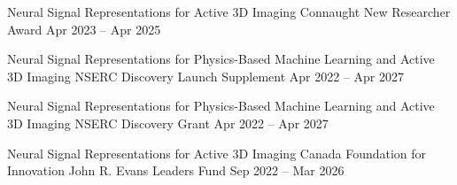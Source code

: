 \cventry[0.5em]{}
{Neural Signal Representations for Active 3D Imaging}
{Connaught New Researcher Award}
{\hspace{-1em}Apr 2023 -- Apr 2025}
{}
{}

\cventry[0.5em]{}
{Neural Signal Representations for Physics-Based Machine Learning and Active 3D Imaging}
{NSERC Discovery Launch Supplement}
{\hspace{-1em}Apr 2022 -- Apr 2027}
{}
{}

\cventry[0.5em]{}
{Neural Signal Representations for Physics-Based Machine Learning and Active 3D Imaging}
{NSERC Discovery Grant}
{\hspace{-1em}Apr 2022 -- Apr 2027}
{}
{}

\cventry[0.5em]{}
{Neural Signal Representations for Active 3D Imaging}
{Canada Foundation for Innovation John R. Evans Leaders Fund}
{Sep 2022 -- Mar 2026}
{}
{}

\endgroup
\endinput
